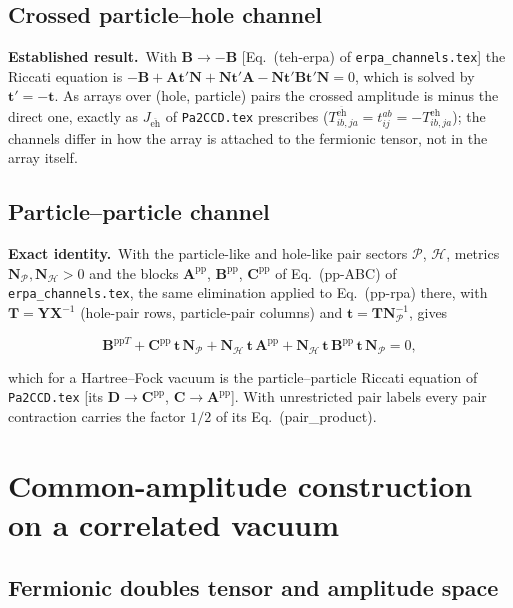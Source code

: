 \documentclass[aip,jcp,reprint,noshowkeys,superscriptaddress]{revtex4-1}
\newcommand{\bA}{\boldsymbol{A}}
\newcommand{\bB}{\boldsymbol{B}}
\newcommand{\bC}{\boldsymbol{C}}
\newcommand{\bD}{\boldsymbol{D}}
\newcommand{\bN}{\boldsymbol{N}}
\newcommand{\bX}{\boldsymbol{X}}
\newcommand{\bY}{\boldsymbol{Y}}
\newcommand{\eh}{\text{eh}}
\newcommand{\teh}{\overline{\text{eh}}}
\newcommand{\pp}{\text{pp}}
\newcommand{\Exact}{\textbf{Exact identity.}\ }
\newcommand{\Established}{\textbf{Established result.}\ }
\newcommand{\bt}{\boldsymbol{t}}
\newcommand{\bT}{\boldsymbol{T}}
\begin{document}
\subsection{Crossed particle--hole channel}

\Established With $\bB\to-\bB$ [Eq.~(teh-erpa) of \texttt{erpa\_channels.tex}]
the Riccati equation is
$-\bB+\bA\bt'\bN+\bN\bt'\bA-\bN\bt'\bB\bt'\bN=0$, which is solved by
$\bt'=-\bt$.  As arrays over (hole, particle) pairs the crossed amplitude is
minus the direct one, exactly as $J_{\teh}$ of \texttt{Pa2CCD.tex} prescribes
($T^{\teh}_{ib,ja}=t^{ab}_{ij}=-T^{\eh}_{ib,ja}$); the channels differ in how
the array is attached to the fermionic tensor, not in the array itself.

\subsection{Particle--particle channel}

\Exact With the particle-like and hole-like pair sectors $\mathcal P$,
$\mathcal H$, metrics $\bN_{\mathcal P},\bN_{\mathcal H}>0$ and the blocks
$\bA^{\pp}$, $\bB^{\pp}$, $\bC^{\pp}$ of Eq.~(pp-ABC) of
\texttt{erpa\_channels.tex}, the same elimination applied to Eq.~(pp-rpa)
there, with $\bT=\bY\bX^{-1}$ (hole-pair rows, particle-pair columns) and
$\bt=\bT\bN_{\mathcal P}^{-1}$, gives
\begin{widetext}
\begin{equation}
  \bB^{\pp T}+\bC^{\pp}\,\bt\,\bN_{\mathcal P}+\bN_{\mathcal H}\,\bt\,\bA^{\pp}
  +\bN_{\mathcal H}\,\bt\,\bB^{\pp}\,\bt\,\bN_{\mathcal P}=0 ,
  \label{eq:riccati-pp}
\end{equation}
\end{widetext}
which for a Hartree--Fock vacuum is the particle--particle Riccati equation
of \texttt{Pa2CCD.tex} [its $\bD\to\bC^{\pp}$, $\bC\to\bA^{\pp}$].  With
unrestricted pair labels every pair contraction carries the factor $1/2$ of
its Eq.~(pair\_product).

\section{Common-amplitude construction on a correlated vacuum}
\label{sec:construction}

\subsection{Fermionic doubles tensor and amplitude space}
\label{sec:space}
\end{document}

